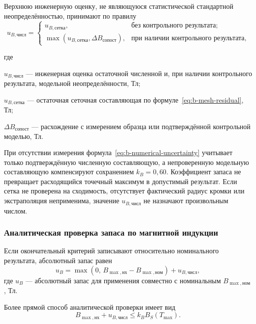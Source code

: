 \documentclass[14pt,a4paper]{extarticle}
\newenvironment{whereblock}
 {\par\noindent где\par
  \begin{list}{}{\setlength{\leftmargin}{12.5mm}
                  \setlength{\itemindent}{-12.5mm}
                  \setlength{\itemsep}{0pt}
                  \setlength{\parsep}{0pt}
                  \setlength{\topsep}{0pt}}}
 {\end{list}}
\newcommand{\whereitem}[2]{\item[] #1 --- #2}
\begin{document}
Верхнюю инженерную оценку, не являющуюся статистической стандартной
неопределённостью, принимают по правилу
\begin{equation}
 u_{B,\text{числ}}=
 \begin{cases}
  u_{B,\text{сетка}},
  &\text{без контрольного результата};\\
  \max\!\left(u_{B,\text{сетка}},
  \Delta B_{\text{сопост}}\right),
  &\text{при наличии контрольного результата},
 \end{cases}
 \label{eq:b-numerical-uncertainty}
\end{equation}
\begin{whereblock}
\whereitem{$u_{B,\text{числ}}$}{инженерная оценка остаточной численной и,
при наличии контрольного результата, модельной неопределённости, Тл;}
\whereitem{$u_{B,\text{сетка}}$}{остаточная сеточная составляющая по
формуле~\eqref{eq:b-mesh-residual}, Тл;}
\whereitem{$\Delta B_{\text{сопост}}$}{расхождение с измерением образца
или подтверждённой контрольной моделью, Тл.}
\end{whereblock}

При отсутствии измерения формула~\eqref{eq:b-numerical-uncertainty}
учитывает только подтверждённую численную составляющую, а непроверенную
модельную составляющую компенсируют сохранением $k_B=0{,}60$. Коэффициент
запаса не превращает расходящийся точечный максимум в допустимый результат.
Если сетка не проверена на сходимость, отсутствует фактический радиус кромки
или экстраполяция неприменима, значение $u_{B,\text{числ}}$ не назначают
произвольным числом.

\subsubsection{Аналитическая проверка запаса по магнитной индукции}

Если окончательный критерий записывают относительно номинального
результата, абсолютный запас равен
\begin{equation}
 u_B=
 \max\left(
 0,\,
 B_{\max,\text{нх}}-B_{\max,\text{ном}}
 \right)
 +u_{B,\text{числ}},
 \label{eq:b-uncertainty}
\end{equation}
где $u_B$ --- абсолютный запас для применения совместно с номинальным
$B_{\max,\text{ном}}$, Тл.

Более прямой способ аналитической проверки имеет вид
\begin{equation}
 B_{\max,\text{нх}}+u_{B,\text{числ}}
 \leq k_B B_S(T_{\max}).
 \label{eq:b-worst-case-direct}
\end{equation}
\end{document}
